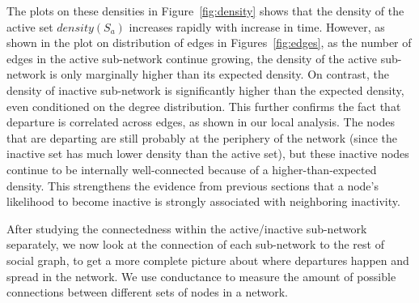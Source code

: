 \documentclass[phd,tocprelim]{cornell}
\renewcommand{\caption}[1]{\singlespacing\hangcaption{#1}\normalspacing}
\begin{document}

The plots on these densities in Figure~\ref{fig:density} shows that the density
of the active set $density(S_a)$ increases rapidly with increase in
time. However, as shown in the plot on distribution of edges in
Figures~\ref{fig:edges}, as the number of edges in the active sub-network continue growing, 
the density of the active sub-network is only marginally higher than its
expected density. On contrast, the density of inactive sub-network is significantly
higher than the expected density, even conditioned on the degree
distribution. This further confirms the fact that departure 
is correlated across edges, as shown in our local analysis. The nodes that
are departing are still probably at the periphery of the network (since the
inactive set has much lower density than the active set), but these inactive
nodes continue to be internally well-connected because of a higher-than-expected
density. This strengthens the evidence from previous sections that a node's
likelihood to become inactive is strongly associated with neighboring
inactivity.

After studying the connectedness within the active/inactive sub-network separately, we now look at the connection of each sub-network to the rest of social graph, to get a more complete picture about where departures happen and spread in the network. We use conductance to measure the amount of possible connections between different sets of nodes in a network. 
\end{document}
